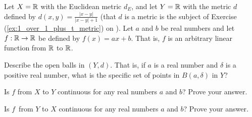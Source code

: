\begin{comment}

\ExerciseSolution Let $(X,d)$ be a metric space and let $x_1$ and $x_2$ be distinct points in $X$. Let $r = \frac{d(x_1,x_2)}{2}$. We know that the open balls $O_1 = B(x_1,r)$ and $O_2 = B(x_2,r)$ are neighborhoods of $x_1$ and $x_2$, respectively. Now we show that $O_1 \cap O_2 = \emptyset$. Suppose $x \in O_1 \cap O_2$. Then $d(x,x_1) < r$ and $d(x_2,x) < r$. This makes
\[d(x_1,x_2) \leq d(x_1,x) + d(x,x_2) < r+r = d(x_1,x_2).\]
This contradiction shows that $O_1 \cap O_2 = \emptyset$. 

\end{comment}

\item \label{ex:linear_continuous} Let $X = \mathbb{R}$ with the Euclidean metric $d_E$, and let $Y = \mathbb{R}$ with the metric $d$ defined by $d(x,y) = \frac{|x-y|}{|x-y|+1}$ (that $d$ is a metric is the subject of Exercise (\ref{ex:1_over_1_plus_t_metric}) on \pageref{ex:1_over_1_plus_t_metric}).  Let $a$ and $b$ be real numbers and let $f:\mathbb{R} \to \mathbb{R}$ be defined by $f(x) = ax+b$. That is, $f$ is an arbitrary linear function from $\mathbb{R}$ to $\mathbb{R}$.

\ba

\item Describe the open balls in $(Y, d)$.  That is, if $a$ is a real number and $\delta$ is a positive real number, what is the specific set of points in $B(a, \delta)$ in $Y$?

\item Is $f$ from $X$ to $Y$ continuous for any real numbers $a$ and $b$? Prove your answer.

\item Is $f$ from $Y$ to $X$ continuous for any real numbers $a$ and $b$? Prove your answer.

\ea

